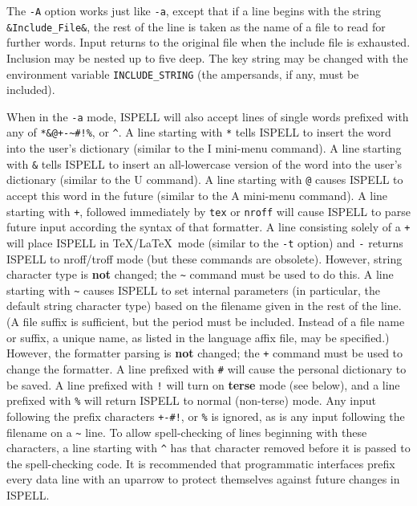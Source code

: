 \documentclass[twoside,11pt]{article}
\begin{document}
\begin{itemize}
The \verb+-A+ option works just like \verb+-a+, except that if a line begins
with the string \verb+&Include_File&+, the rest of the line is taken as the
name of a file to read for further words.
Input returns to the original file when the include file is exhausted.
Inclusion may be nested up to five deep.
The key string may be changed with the environment variable
\verb+INCLUDE_STRING+ (the ampersands, if any, must be included).

When in the \verb+-a+ mode, ISPELL will also accept lines of single words
prefixed with any of \verb=*&@+-~#!%=, or \verb+^+\@.
A line starting with \verb+*+ tells ISPELL to insert the word into the user's
dictionary (similar to the I mini-menu command).
A line starting with \verb+&+ tells ISPELL to insert an all-lowercase version
of the word into the user's dictionary (similar to the U command).
A line starting with \verb+@+ causes ISPELL to accept this word in the future
(similar to the A mini-menu command).
A line starting with \verb-+-, followed immediately by \verb+tex+ or
\verb+nroff+ will cause ISPELL to parse future input according the syntax of
that formatter.
A line consisting solely of a \verb-+- will place ISPELL in \TeX /\LaTeX\ mode
(similar to the \verb+-t+ option) and \verb+-+ returns ISPELL to nroff/troff
mode (but these commands are obsolete).
However, string character type is {\bf not} changed; the \verb+~+ command
must be used to do this.
A line starting with \verb+~+ causes ISPELL to set internal parameters (in
particular, the default string character type) based on the filename given in
the rest of the line.
(A file suffix is sufficient, but the period must be included.
Instead of a file name or suffix, a unique name, as listed in the language
affix file, may be specified.)
However, the formatter parsing is {\bf not} changed; the \verb-+- command must
be used to change the formatter.
A line prefixed with \verb+#+ will cause the personal dictionary to be saved.
A line prefixed with \verb+!+ will turn on {\bf terse} mode (see below), and
a line prefixed with \verb+%+ will return ISPELL to normal (non-terse) mode.
Any input following the prefix characters \verb=+-#!=, or \verb+%+ is ignored,
as is any input following the filename on a \verb+~+ line.
To allow spell-checking of lines beginning with these characters, a line
starting with \verb+^+ has that character removed before it is passed to the
spell-checking code.
It is recommended that programmatic interfaces prefix every data line with an
uparrow to protect themselves against future changes in ISPELL\@.


\end{itemize}
\end{document}
